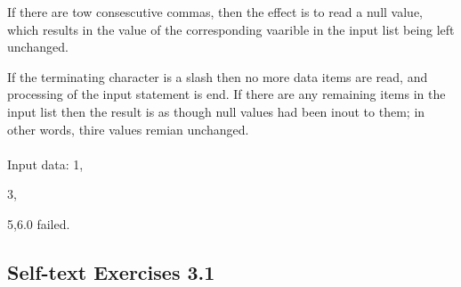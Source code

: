 \documentclass[a4paper,titlepage]{report}
\theoremstyle{definition}
\begin{document}
If there are tow consescutive commas, then the effect is to read a null value, which results in the value of the corresponding vaarible in the input list being left unchanged.

If the terminating character is a slash then no more data items are read, and processing of the input statement is end. If there are any remaining items in the input list then the result is as though null values had been inout to them; in other words, thire values remian unchanged. \\ \\
\setlength{\parindent}{13ex}
Input data: 1,\par 3,\par 5,6.0 failed.

\subsection*{Self-text Exercises 3.1}
\end{document}
